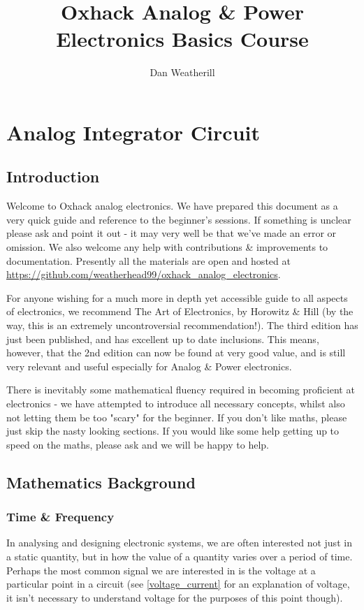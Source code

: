 \documentclass{memoir}
\title{Oxhack Analog \& Power Electronics Basics Course}
\author{Dan Weatherill}
\begin{document}
	\maketitle
	\chapter{Analog Integrator Circuit}
	
	\section{Introduction}
	Welcome to Oxhack analog electronics. We have prepared this document as a very quick guide and reference to the beginner's sessions. If something is unclear please ask and point it out - it may very well be that we've made an error or omission. We also welcome any help with contributions \& improvements to documentation. Presently all the materials are open and hosted at \url{https://github.com/weatherhead99/oxhack_analog_electronics}.

	For anyone wishing for a much more in depth yet accessible guide to all aspects of electronics, we recommend The Art of Electronics, by Horowitz \& Hill (by the way, this is an extremely uncontroversial recommendation!). The third edition has just been published, and has excellent up to date inclusions. This means, however, that the 2nd edition can now be found at very good value, and is still very relevant and useful especially for Analog \& Power electronics.
	
	There is inevitably some mathematical fluency required in becoming proficient at electronics - we have attempted to introduce all necessary concepts, whilst also not letting them be too "scary" for the beginner. If you don't like maths, please just skip the nasty looking sections. If you would like some help getting up to speed on the maths, please ask and we will be happy to help.
	
	\section{Mathematics Background}
	\subsection{Time \& Frequency}
	In analysing and designing electronic systems, we are often interested not just in a static quantity, but in how the value of a quantity varies over a period of time. Perhaps the most common signal we are interested in is the voltage at a particular point in a circuit (see \autoref{voltage_current} for an explanation of voltage, it isn't necessary to understand voltage for the purposes of this point though).
\end{document}
